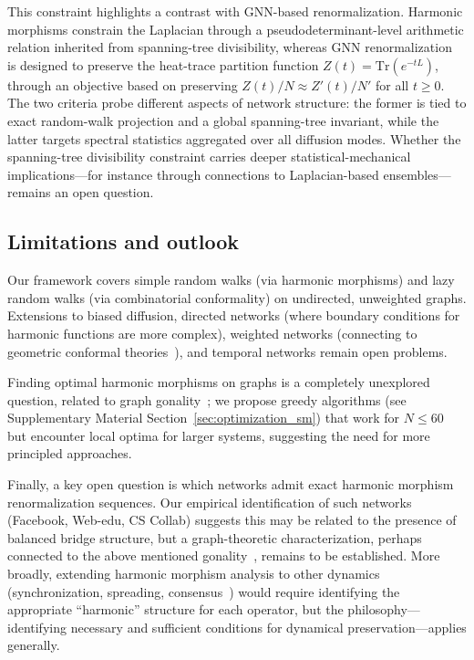 \documentclass[twocolumn,superscriptaddress,tightenlines,aps,prx,floatfix]{revtex4-2}
\begin{document}
\begin{bibunit}
This constraint highlights a contrast with GNN-based renormalization. 
Harmonic morphisms constrain the Laplacian through a 
pseudodeterminant-level arithmetic relation inherited from 
spanning-tree divisibility, whereas GNN 
renormalization~\cite{Coarse_graining_network_De_Domenico} is designed 
to preserve the heat-trace partition function 
$Z(t) = \mathrm{Tr}(e^{-tL})$, through an objective based on 
preserving $Z(t)/N \approx Z'(t)/N'$ for all $t \geq 0$. 
The two  criteria probe different aspects of network structure: the former is 
tied to exact random-walk projection and a global spanning-tree 
invariant, while the latter targets spectral statistics aggregated 
over all diffusion modes. 
Whether the spanning-tree divisibility 
constraint carries deeper statistical-mechanical implications---for 
instance through connections to Laplacian-based ensembles---remains 
an open question.

\subsection{Limitations and outlook}
Our framework covers simple random walks (via harmonic morphisms) and lazy random walks (via combinatorial conformality) on undirected, unweighted graphs. 
Extensions to biased diffusion, directed networks (where boundary conditions for harmonic functions are more complex), weighted networks (connecting to geometric conformal theories~\cite{Bobenko_Conformal_2015}), and temporal networks remain open problems. 

Finding optimal harmonic morphisms on graphs is a completely unexplored question, related to graph gonality~\cite{Caporaso_Gonality_2}; we propose greedy algorithms (see Supplementary Material Section~\ref{sec:optimization_sm}) that work for $N \leq 60$ but encounter local optima for larger systems, suggesting the need for more principled approaches. 

Finally, a key open question is which networks admit exact harmonic morphism renormalization sequences. 
Our empirical identification of such networks (Facebook, Web-edu, CS Collab) suggests this may be related to the presence of balanced bridge structure, but a graph-theoretic characterization, perhaps connected to the above mentioned gonality~\cite{Caporaso_Gonality_2}, remains to be established. 
More broadly, extending harmonic morphism analysis to other dynamics (synchronization, spreading, consensus~\cite{Consensus_coarse_graining_Barahona}) would require identifying the appropriate ``harmonic'' structure for each operator, but the philosophy---identifying necessary and sufficient conditions for dynamical preservation---applies generally.


\end{bibunit}
\end{document}
